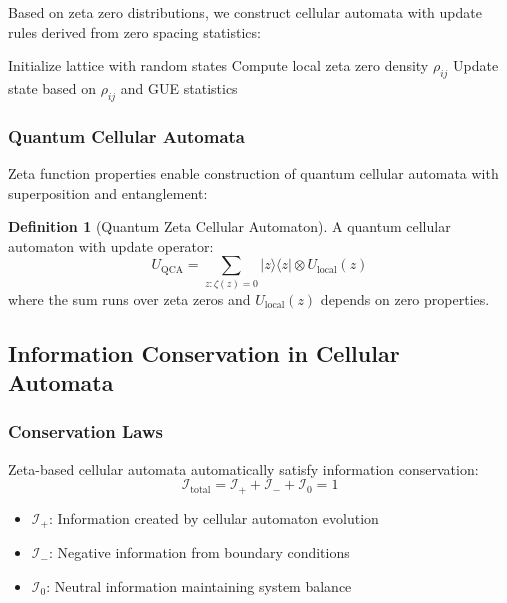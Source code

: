 \documentclass[12pt]{article}
\theoremstyle{plain}
\theoremstyle{definition}
\newtheorem{definition}[theorem]{Definition}
\newcommand{\cI}{\mathcal{I}}
\begin{document}
Based on zeta zero distributions, we construct cellular automata with update rules derived from zero spacing statistics:

\begin{algorithm}
\caption{Zeta Zero Cellular Automaton}
\begin{algorithmic}
\STATE Initialize lattice with random states
        \STATE Compute local zeta zero density $\rho_{ij}$
        \STATE Update state based on $\rho_{ij}$ and GUE statistics
    \ENDFOR
\ENDFOR
\end{algorithmic}
\end{algorithm}

\subsubsection{Quantum Cellular Automata}

Zeta function properties enable construction of quantum cellular automata with superposition and entanglement:

\begin{definition}[Quantum Zeta Cellular Automaton]
A quantum cellular automaton with update operator:
$$U_{\text{QCA}} = \sum_{z: \zeta(z)=0} |z\rangle\langle z| \otimes U_{\text{local}}(z)$$
where the sum runs over zeta zeros and $U_{\text{local}}(z)$ depends on zero properties.
\end{definition}

\subsection{Information Conservation in Cellular Automata}

\subsubsection{Conservation Laws}

Zeta-based cellular automata automatically satisfy information conservation:
$$\cI_{\text{total}} = \cI_+ + \cI_- + \cI_0 = 1$$

\begin{itemize}
\item $\cI_+$: Information created by cellular automaton evolution
\item $\cI_-$: Negative information from boundary conditions
\item $\cI_0$: Neutral information maintaining system balance
\end{itemize}
\end{document}
